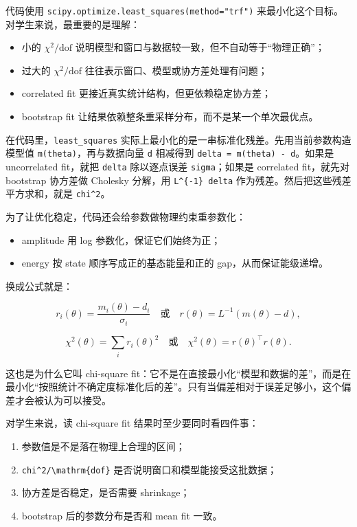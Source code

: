 \documentclass[11pt,a4paper,fontset=fandol]{ctexart}
\begin{document}
代码使用 \lstinline|scipy.optimize.least_squares(method="trf")| 来最小化这个目标。对学生来说，最重要的是理解：

\begin{itemize}[leftmargin=2em]
  \item 小的 $\chi^2/\mathrm{dof}$ 说明模型和窗口与数据较一致，但不自动等于“物理正确”；
  \item 过大的 $\chi^2/\mathrm{dof}$ 往往表示窗口、模型或协方差处理有问题；
  \item correlated fit 更接近真实统计结构，但更依赖稳定协方差；
  \item bootstrap fit 让结果依赖整条重采样分布，而不是某一个单次最优点。
\end{itemize}

在代码里，\lstinline|least_squares| 实际上最小化的是一串标准化残差。先用当前参数构造模型值 \lstinline|m(theta)|，再与数据向量 \lstinline|d| 相减得到 \lstinline|delta = m(theta) - d|。如果是 uncorrelated fit，就把 \lstinline|delta| 除以逐点误差 \lstinline|sigma|；如果是 correlated fit，就先对 bootstrap 协方差做 Cholesky 分解，用 \lstinline|L^{-1} delta| 作为残差。然后把这些残差平方求和，就是 \lstinline|chi^2|。

为了让优化稳定，代码还会给参数做物理约束重参数化：

\begin{itemize}[leftmargin=2em]
  \item amplitude 用 log 参数化，保证它们始终为正；
  \item energy 按 state 顺序写成正的基态能量和正的 gap，从而保证能级递增。
\end{itemize}

换成公式就是：

\begin{equation}
r_i(\theta) = \frac{m_i(\theta)-d_i}{\sigma_i}
\quad \text{或} \quad
r(\theta) = L^{-1}(m(\theta)-d),
\end{equation}

\begin{equation}
\chi^2(\theta)=\sum_i r_i(\theta)^2
\quad \text{或} \quad
\chi^2(\theta)=r(\theta)^\top r(\theta).
\end{equation}

这也是为什么它叫 chi-square fit：它不是在直接最小化“模型和数据的差”，而是在最小化“按照统计不确定度标准化后的差”。只有当偏差相对于误差足够小，这个偏差才会被认为可以接受。

对学生来说，读 chi-square fit 结果时至少要同时看四件事：

\begin{enumerate}[leftmargin=2em]
  \item 参数值是不是落在物理上合理的区间；
  \item \lstinline|chi^2/\mathrm{dof}| 是否说明窗口和模型能接受这批数据；
  \item 协方差是否稳定，是否需要 shrinkage；
  \item bootstrap 后的参数分布是否和 mean fit 一致。
\end{enumerate}
\end{document}
